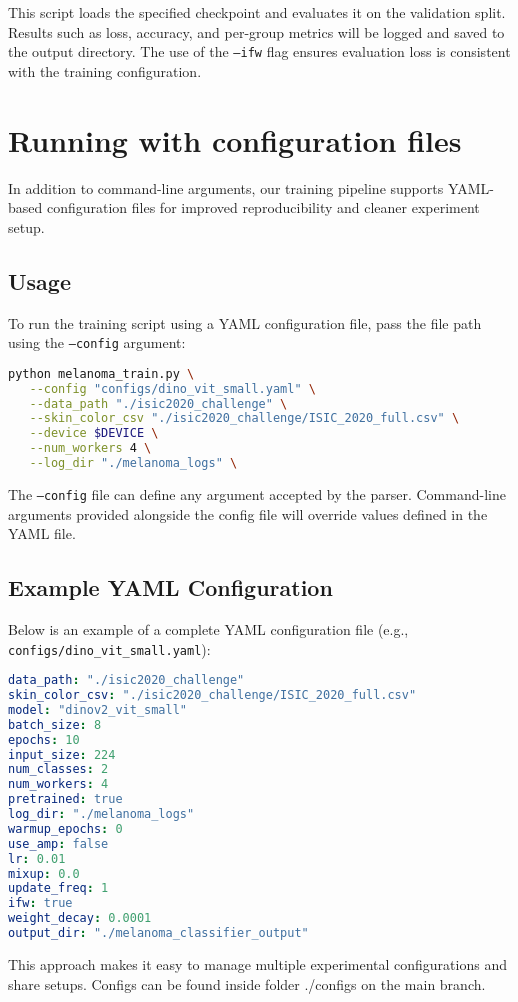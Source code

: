 This script loads the specified checkpoint and evaluates it on the validation split. Results such as loss, accuracy, and per-group metrics will be logged and saved to the output directory. The use of the \texttt{--ifw} flag ensures evaluation loss is consistent with the training configuration.

\section{Running with configuration files}

In addition to command-line arguments, our training pipeline supports YAML-based configuration files for improved reproducibility and cleaner experiment setup.

\subsection*{Usage}

To run the training script using a YAML configuration file, pass the file path using the \texttt{--config} argument:

\begin{lstlisting}[language=bash, caption={Run training using a config file}, label={lst:yaml_config_usage}]
python melanoma_train.py \
   --config "configs/dino_vit_small.yaml" \
   --data_path "./isic2020_challenge" \
   --skin_color_csv "./isic2020_challenge/ISIC_2020_full.csv" \
   --device $DEVICE \
   --num_workers 4 \
   --log_dir "./melanoma_logs" \
\end{lstlisting}

The \texttt{--config} file can define any argument accepted by the parser. Command-line arguments provided alongside the config file will override values defined in the YAML file.

\subsection*{Example YAML Configuration}

Below is an example of a complete YAML configuration file (e.g., \texttt{configs/dino\_vit\_small.yaml}):

\begin{lstlisting}[language=yaml, caption={YAML config file example}, label={lst:yaml_config_file}]
data_path: "./isic2020_challenge"
skin_color_csv: "./isic2020_challenge/ISIC_2020_full.csv"
model: "dinov2_vit_small"
batch_size: 8
epochs: 10
input_size: 224
num_classes: 2
num_workers: 4
pretrained: true
log_dir: "./melanoma_logs"
warmup_epochs: 0
use_amp: false
lr: 0.01
mixup: 0.0
update_freq: 1
ifw: true
weight_decay: 0.0001
output_dir: "./melanoma_classifier_output"
\end{lstlisting}

This approach makes it easy to manage multiple experimental configurations and share setups. Configs can be found inside folder ./configs on the main branch.
